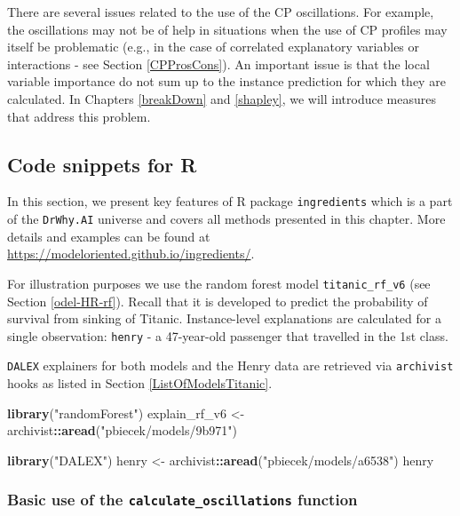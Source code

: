 \documentclass[12pt,]{krantz}
\newenvironment{Shaded}{\begin{snugshade}}{\end{snugshade}}
\newcommand{\KeywordTok}[1]{\textcolor[rgb]{0.13,0.29,0.53}{\textbf{#1}}}
\newcommand{\NormalTok}[1]{#1}
\newcommand{\OperatorTok}[1]{\textcolor[rgb]{0.81,0.36,0.00}{\textbf{#1}}}
\newcommand{\StringTok}[1]{\textcolor[rgb]{0.31,0.60,0.02}{#1}}
\theoremstyle{definition}
\theoremstyle{definition}
\theoremstyle{definition}
\theoremstyle{remark}
\begin{document}
There are several issues related to the use of the CP oscillations. For
example, the oscillations may not be of help in situations when the use
of CP profiles may itself be problematic (e.g., in the case of
correlated explanatory variables or interactions - see Section
\ref{CPProsCons}). An important issue is that the local variable
importance do not sum up to the instance prediction for which they are
calculated. In Chapters \ref{breakDown} and \ref{shapley}, we will
introduce measures that address this problem.

\hypertarget{CPOscR}{%
\subsection{Code snippets for R}\label{CPOscR}}

In this section, we present key features of R package
\texttt{ingredients} which is a part of the \texttt{DrWhy.AI} universe
and covers all methods presented in this chapter. More details and
examples can be found at
\url{https://modeloriented.github.io/ingredients/}.

For illustration purposes we use the random forest model
\texttt{titanic\_rf\_v6} (see Section \ref{odel-HR-rf}). Recall that it
is developed to predict the probability of survival from sinking of
Titanic. Instance-level explanations are calculated for a single
observation: \texttt{henry} - a 47-year-old passenger that travelled in
the 1st class.

\texttt{DALEX} explainers for both models and the Henry data are
retrieved via \texttt{archivist} hooks as listed in Section
\ref{ListOfModelsTitanic}.

\begin{Shaded}
\begin{Highlighting}[]
\KeywordTok{library}\NormalTok{(}\StringTok{"randomForest"}\NormalTok{)}
\NormalTok{explain_rf_v6 <-}\StringTok{ }\NormalTok{archivist}\OperatorTok{::}\KeywordTok{aread}\NormalTok{(}\StringTok{"pbiecek/models/9b971"}\NormalTok{)}

\KeywordTok{library}\NormalTok{(}\StringTok{"DALEX"}\NormalTok{)}
\NormalTok{henry <-}\StringTok{ }\NormalTok{archivist}\OperatorTok{::}\KeywordTok{aread}\NormalTok{(}\StringTok{"pbiecek/models/a6538"}\NormalTok{)}
\NormalTok{henry}
\end{Highlighting}
\end{Shaded}

\hypertarget{basic-use-of-the-calculate_oscillations-function}{%
\subsubsection{\texorpdfstring{Basic use of the
\texttt{calculate\_oscillations}
function}{Basic use of the calculate\_oscillations function}}\label{basic-use-of-the-calculate_oscillations-function}}
\end{document}
